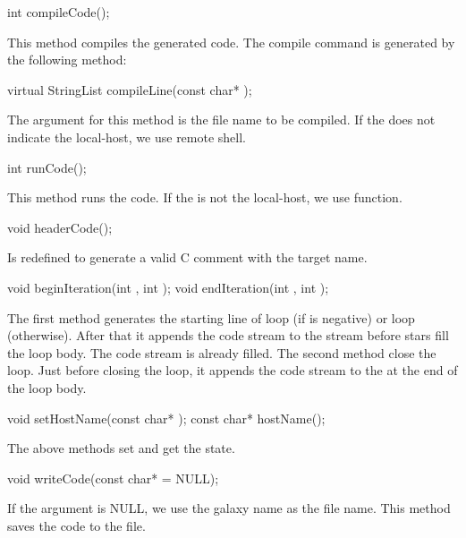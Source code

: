 {\begin{example}
int compileCode();
\end{example}

This method compiles the generated code. The compile command is generated
by the following method:

\begin{example}
virtual StringList compileLine(const char* );
\end{example}

The argument for this method is the file name to be compiled. If the
 does not indicate the local-host, we use remote
shell.

\begin{example}
int runCode();
\end{example}

This method runs the code. If the  is not the
local-host, we use  function.

\begin{example}
void headerCode();
\end{example}

Is redefined to generate a valid C comment with the target name.

\begin{example}
void beginIteration(int , int );
void endIteration(int , int );
\end{example}

The first method generates the starting line of  loop
(if  is negative) or  loop (otherwise).
After that it appends the  code stream to the 
stream before stars fill the loop body. The  code stream
is already filled. The second method close the loop. Just before closing
the loop, it appends the  code stream to the 
at the end of the loop body.

\begin{example}
void setHostName(const char* );
const char* hostName();
\end{example}

The above methods set and get the  state.

\begin{example}
void writeCode(const char*  = NULL);
\end{example}

If the argument is NULL, we use the galaxy name as the file name.
This method saves the code to the file.

}
